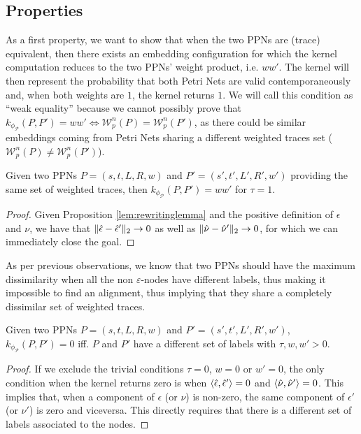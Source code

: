 \subsection{Properties}
As a first property, we want to show that when the two PPNs are (trace) equivalent, then there exists an embedding configuration for which the kernel computation reduces to the two PPNs' weight product, i.e. $ww'$. The kernel will then represent the probability that both Petri Nets are valid contemporaneously and, when both weights are $1$, the kernel returns $1$. We will call this condition as ``weak equality'' because we cannot possibly prove that $k_{\phi_{\mathcal{P}}}(P,P')=ww'\Leftrightarrow \mathcal{W}_p^n(P)=\mathcal{W}_p^n(P')$, as there could be similar embeddings coming from Petri Nets sharing a different weighted traces set ($\mathcal{W}_p^n(P)\neq\mathcal{W}_p^n(P')$).

\begin{lemma}
Given two PPNs $P=(s,t,L,R,w)$ and $P'=(s',t',L',R',w')$ providing the same set of weighted traces, then $k_{\phi_{\mathcal{P}}}(P,P')=ww'$ for $\tau=1$.
\end{lemma}
\begin{proof}
Given Proposition \ref{lem:rewritinglemma} and the positive definition of $\epsilon$ and $\nu$,  we have that $\|\hat{\epsilon}-\hat{\epsilon}'\|_{2}\to 0$ as well as $\|\hat{\nu}-\hat{\nu}'\|_{2}\to 0$, for which we can immediately close the goal.
\end{proof}

As per previous observations, we know that two PPNs should have the maximum dissimilarity when all the non $\varepsilon$-nodes have different labels, thus making it impossible to find an alignment, thus implying that they share a completely dissimilar set of weighted traces.

\begin{lemma}
Given two PPNs $P=(s,t,L,R,w)$ and $P'=(s',t',L',R',w')$, $k_{\phi_{\mathcal{P}}}(P,P')=0$ iff. $P$ and $P'$ have a different set of labels with $\tau,w,w'>0$.
\end{lemma}
\begin{proof}
If we exclude the trivial conditions $\tau=0$, $w=0$ or $w'=0$, the only condition when the kernel returns zero is when  $\Braket{\hat{\epsilon},\hat{\epsilon}'}=0$ and $\Braket{\hat{\nu},\hat{\nu}'}=0$. This implies that, when a component of $\epsilon$ (or $\nu$) is non-zero, the same component of $\epsilon'$ (or $\nu'$) is zero and viceversa. This directly requires that there is a different set of labels associated to the nodes. 
\end{proof}

